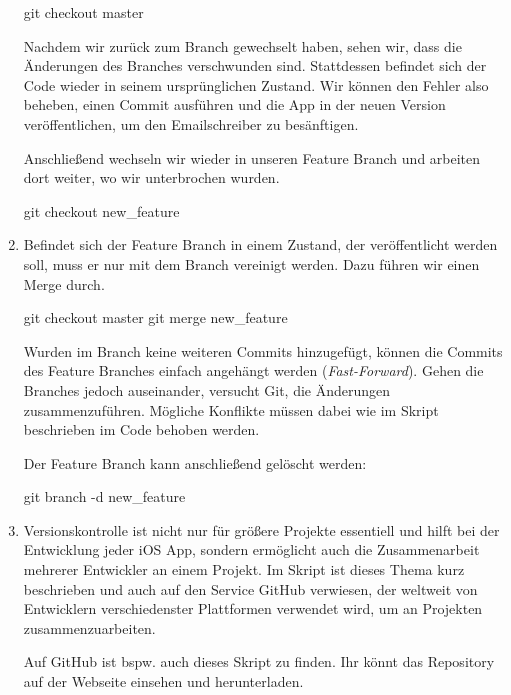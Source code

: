 \documentclass[parskip=half, final]{scrreprt}
\begin{document}
\begin{lecture}
\begin{enumerate}
\begin{shcode}
git checkout master
\end{shcode}

Nachdem wir zurück zum  Branch gewechselt haben, sehen wir, dass die Änderungen des  Branches verschwunden sind. Stattdessen befindet sich der Code wieder in seinem ursprünglichen Zustand. Wir können den Fehler also beheben, einen Commit ausführen und die App in der neuen Version veröffentlichen, um den Emailschreiber zu besänftigen.

Anschließend wechseln wir wieder in unseren Feature Branch und arbeiten dort weiter, wo wir unterbrochen wurden.

\begin{shcode}
git checkout new_feature
\end{shcode}

\item Befindet sich der Feature Branch in einem Zustand, der veröffentlicht werden soll, muss er nur mit dem  Branch vereinigt werden. Dazu führen wir einen Merge durch.

\begin{shcode}
git checkout master
git merge new_feature
\end{shcode}

Wurden im  Branch keine weiteren Commits hinzugefügt, können die Commits des Feature Branches einfach angehängt werden (\emph{Fast-Forward}). Gehen die Branches jedoch auseinander, versucht Git, die Änderungen zusammenzuführen. Mögliche Konflikte müssen dabei wie im Skript beschrieben im Code behoben werden.

Der Feature Branch kann anschließend gelöscht werden:

\begin{shcode}
git branch -d new_feature
\end{shcode}

\item Versionskontrolle ist nicht nur für größere Projekte essentiell und hilft bei der Entwicklung jeder iOS App, sondern ermöglicht auch die Zusammenarbeit mehrerer Entwickler an einem Projekt. Im Skript ist dieses Thema kurz beschrieben und auch auf den Service GitHub  verwiesen, der weltweit von Entwicklern verschiedenster Plattformen verwendet wird, um an Projekten zusammenzuarbeiten.

Auf GitHub ist bspw. auch dieses Skript zu finden. Ihr könnt das Repository auf der Webseite einsehen  und herunterladen.


\end{enumerate}
\end{lecture}
\end{document}

